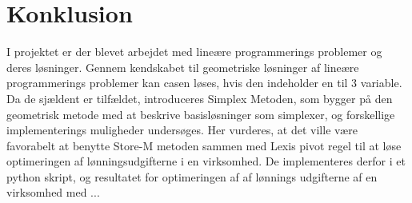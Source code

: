 \chapter{Konklusion}
I projektet er der blevet arbejdet med lineære programmerings problemer og deres løsninger.
Gennem kendskabet til geometriske løsninger af lineære programmerings problemer kan casen løses, hvis den indeholder en til 3 variable.
Da de sjældent er tilfældet, introduceres Simplex Metoden, som bygger på den geometrisk metode med at beskrive basisløsninger som simplexer, og 
forskellige implementerings muligheder undersøges. 
Her vurderes, at det ville være favorabelt at benytte Store-M metoden sammen med Lexis pivot regel til at løse optimeringen af lønningsudgifterne i en virksomhed.
De implementeres derfor i et python skript, og resultatet for optimeringen af af lønnings udgifterne af en virksomhed med ...
